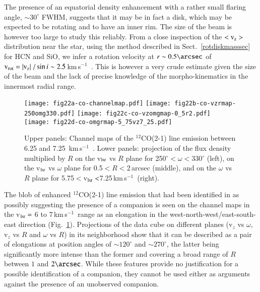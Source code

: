 \documentclass{aa}
\newcommand{\kms}{\,km\,s$^{-1}$~}
\begin{document}
The presence of an equatorial density enhancement with a rather small
flaring angle, $\sim 30^\circ$ FWHM, suggests that it may be in  fact
a disk, which may be expected to be rotating and to have an inner
rim. The size of the beam is however too large to study this
reliably. From a close inspection of the $< {\rm v_z} >$ distribution
near the star,  using the method described in
Sect.~\ref{rotdiskmasssec}  for HCN and SiO, we infer a rotation
velocity at $r \sim 0.5\arcsec$ of ${\rm v_{rot}}=|{\rm v_z}|~/\sin i
\sim 2.5$\kms.  This is however a very crude estimate given the size
of the beam and the lack of precise knowledge of the morpho-kinematics
in the innermost radial range.

\begin{figure*}
  \centering
  \texttt{[image: fig22a-co-channelmap.pdf]}
      \texttt{[image: fig22b-co-vzrmap-250omg330.pdf]}
      \texttt{[image: fig22c-co-vzomgmap-0\_5r2.pdf]}
      \texttt{[image: fig22d-co-omgrmap-5\_75vz7\_25.pdf]}
 \caption{Upper panels: Channel maps of the $^{12}$CO(2-1) line
                        emission between 6.25 and 7.25 \kms. 
          Lower panels:
                       projection of the flux density multiplied by $R$ on the 
                       v$_{\rm lsr}$ vs $R$ plane for 
                       250$^{\circ}<\omega<$330$^{\circ}$ (left), on the
                       v$_{\rm lsr}$ vs $\omega$ plane for 0.5$<R<$2\,arcsec 
                       (middle), and on the $\omega$ vs $R$ plane for
                       5.75$<$v$_{\rm lsr}<$7.25\kms (right).}
 \label{companionfig}
\end{figure*}

The blob of enhanced $^{12}$CO(2-1) line emission that had been
identified in \citet{hmwng14} as possibly suggesting the presence of a
companion is seen on the channel maps in the v$_{\rm lsr} =$ 6 to
7\kms range as an elongation in the west-north-west/east-south-east
direction (Fig.~\ref{companionfig}).  Projections of the data cube on
different planes (v$_z$ vs $\omega$, v$_z$ vs $R$ and $\omega$ vs $R$)
in its neighborhood show that it can be described as a pair of
elongations at position angles of $\sim120^\circ$ and $\sim270^\circ$,
the latter being significantly more  intense than the former and
covering a broad range of $R$ between $1$ and $2\arcsec$.  While these
features provide no justification for a possible identification of a
companion, they cannot be used either as arguments against the
presence of an unobserved companion.
\end{document}
